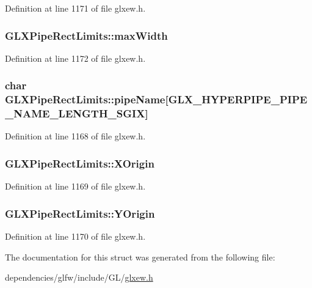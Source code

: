 Definition at line 1171 of file glxew.\-h.

\hypertarget{struct_g_l_x_pipe_rect_limits_a8662c7a712b30620e25fc994adf337a1}{
\subsubsection[{max\-Width}]{ G\-L\-X\-Pipe\-Rect\-Limits\-::max\-Width}}\label{struct_g_l_x_pipe_rect_limits_a8662c7a712b30620e25fc994adf337a1}


Definition at line 1172 of file glxew.\-h.

\hypertarget{struct_g_l_x_pipe_rect_limits_ae78b4b6656101bc841946733a5b6e5ce}{
\subsubsection[{pipe\-Name}]{\setlength{\rightskip}{0pt plus 5cm}char G\-L\-X\-Pipe\-Rect\-Limits\-::pipe\-Name\mbox{[}{\bf G\-L\-X\-\_\-\-H\-Y\-P\-E\-R\-P\-I\-P\-E\-\_\-\-P\-I\-P\-E\-\_\-\-N\-A\-M\-E\-\_\-\-L\-E\-N\-G\-T\-H\-\_\-\-S\-G\-I\-X}\mbox{]}}}\label{struct_g_l_x_pipe_rect_limits_ae78b4b6656101bc841946733a5b6e5ce}


Definition at line 1168 of file glxew.\-h.

\hypertarget{struct_g_l_x_pipe_rect_limits_a3e5a965059d9f5d2ca42acd35af5bb9b}{
\subsubsection[{X\-Origin}]{ G\-L\-X\-Pipe\-Rect\-Limits\-::\-X\-Origin}}\label{struct_g_l_x_pipe_rect_limits_a3e5a965059d9f5d2ca42acd35af5bb9b}


Definition at line 1169 of file glxew.\-h.

\hypertarget{struct_g_l_x_pipe_rect_limits_a50e06bcf0dae95854be7d93a515199e9}{
\subsubsection[{Y\-Origin}]{ G\-L\-X\-Pipe\-Rect\-Limits\-::\-Y\-Origin}}\label{struct_g_l_x_pipe_rect_limits_a50e06bcf0dae95854be7d93a515199e9}


Definition at line 1170 of file glxew.\-h.



The documentation for this struct was generated from the following file\-:\begin{DoxyCompactItemize}
\item 
dependencies/glfw/include/\-G\-L/\hyperlink{glxew_8h}{glxew.\-h}\end{DoxyCompactItemize}
